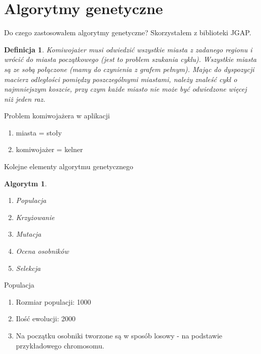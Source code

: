 \documentclass[a4paper,10pt]{beamer}
\newtheorem{defi}{Definicja}[subsection]
\newtheorem{alg}{Algorytm}[subsection]
\begin{document}
		\section{Algorytmy genetyczne}
		\begin{frame}{Do czego zastosowałem algorytmy genetyczne?}
			Skorzystałem z biblioteki JGAP.
			\begin{defi}
				Komiwojażer musi odwiedzić wszystkie miasta z zadanego regionu i wrócić do miasta początkowego (jest to problem szukania cyklu). Wszystkie miasta są ze sobą połączone (mamy do czynienia z grafem pełnym). Mając do dyspozycji macierz odległości pomiędzy poszczególnymi miastami, należy znaleść cykl o najmniejszym koszcie, przy czym każde miasto nie może być odwiedzone więcej niż jeden raz.
			\end{defi}
			
		\end{frame}
		\begin{frame}{Problem komiwojażera w aplikacji}
			\begin{enumerate}
				\item miasta = stoły
				\item komiwojażer = kelner
			\end{enumerate}
		\end{frame}
		\begin{frame}{Kolejne elementy algorytmu genetycznego}
			\begin{alg}
				\begin{enumerate}
					\item Populacja
					\item Krzyżowanie
					\item Mutacja
					\item Ocena osobników
					\item Selekcja
				\end{enumerate}
			\end{alg}
		\end{frame}
		\begin{frame}{Populacja}
			\begin{enumerate}
				\item Rozmiar populacji: 1000
				\item Ilość ewolucji: 2000
				\item Na początku osobniki tworzone są w sposób losowy - na podstawie przykładowego chromosomu.
			\end{enumerate}
		\end{frame}
\end{document}
